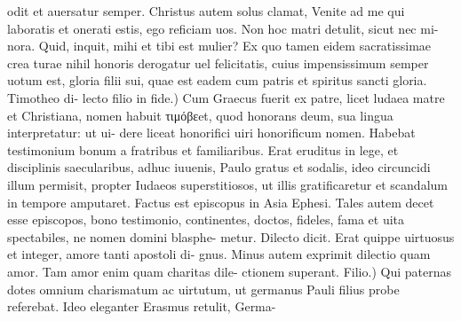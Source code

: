 \documentclass{article}
\begin{document}
\begin{pages}
odit et auersatur semper. Christus autem solus clamat, Venite ad me qui laboratis et onerati estis, ego reficiam uos. Non hoc matri detulit, sicut nec mi- nora. Quid, inquit, mihi et tibi est mulier? Ex quo tamen eidem sacratissimae crea turae nihil honoris derogatur uel felicitatis, cuius impensissimum semper uotum est, gloria filii sui, quae est eadem cum patris et spiritus sancti gloria. Timotheo di- lecto filio in fide.) Cum Graecus fuerit ex patre, licet ludaea matre et Christiana, nomen habuit τιμόβεet, quod honorans deum, sua lingua interpretatur: ut ui- dere liceat honorifici uiri honorificum nomen. Habebat testimonium bonum a fratribus et familiaribus. Erat eruditus in lege, et disciplinis saecularibus, adhuc iuuenis, Paulo gratus et sodalis, ideo circuncidi illum permisit, propter Iudaeos superstitiosos, ut illis gratificaretur et scandalum in tempore amputaret. Factus est episcopus in Asia Ephesi. Tales autem decet esse episcopos, bono testimonio, continentes, doctos, fideles, fama et uita spectabiles, ne nomen domini blasphe- metur. Dilecto dicit. Erat quippe uirtuosus et integer, amore tanti apostoli di- gnus. Minus autem exprimit dilectio quam amor. Tam amor enim quam charitas dile- ctionem superant. Filio.) Qui paternas dotes omnium charismatum ac uirtutum, ut germanus Pauli filius probe referebat. Ideo eleganter Erasmus retulit, Germa-  \pend

\end{pages}
\end{document}
